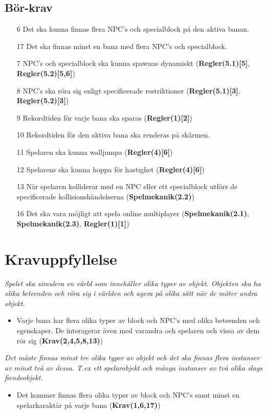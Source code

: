 \documentclass{TDP003mall}
\begin{document}
\subsection{Bör-krav}
\begin{itemize}
\item[6] Det ska kunna finnas flera NPC's och specialblock på den aktiva banan.
\item[17] Det ska finnas minst en bana med flera NPC's och specialblock.
\item[7] NPC's och specialblock ska kunna spawnas dynamiskt (\textbf{Regler(5.1)[5]}, \textbf{Regler(5.2)[5,6]})
\item[8] NPC's ska röra sig enligt specificerade restriktioner (\textbf{Regler(5.1)[3]}, \textbf{Regler(5.2)[3]})
\item[9] Rekordtiden för varje bana ska sparas (\textbf{Regler(1)[2]})
\item[10] Rekordtiden för den aktiva bana ska renderas på skärmen.
\item[11] Spelaren ska kunna walljumpa (\textbf{Regler(4)[6]})
\item[12] Spelarens ska kunna hoppa för hastighet (\textbf{Regler(4)[6]})
\item[13] När spelaren kolliderar med en NPC eller ett specialblock utförs de specificerade kollisionshändelserna (\textbf{Spelmekanik(2.2)})
\item[16] Det ska vara möjligt att spela online multiplayer (\textbf{Spelmekanik(2.1)}, \textbf{Spelmekanik(2.3)}, \textbf{Regler(1)[1]})
\end{itemize}

\section{Kravuppfyllelse}
\textit{Spelet ska simulera en värld som innehåller olika typer av objekt. Objekten ska ha olika beteenden och röra
sig i världen och agera på olika sätt när de möter andra objekt.}
\begin{itemize}
\item Varje bana har flera olika typer av block och NPC's med olika beteenden och egenskaper. De interagerar även med varandra och spelaren och vissa av dem rör sig (\textbf{Krav(2,4,5,8,13)})
\end{itemize}


\noindent\textit{Det måste finnas minst tre olika typer av objekt och det ska finnas flera instanser av minst två av dessa.
T.ex ett spelarobjekt och många instanser av två olika slags fiendeobjekt.}
\begin{itemize}
\item Det kommer finnas flera olika typer av block och NPC's samt minst en spelarkaraktär på varje bana (\textbf{Krav(1,6,17)})
\end{itemize}
\end{document}
